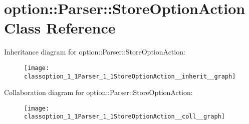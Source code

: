 \hypertarget{classoption_1_1Parser_1_1StoreOptionAction}{}\section{option\+:\+:Parser\+:\+:Store\+Option\+Action Class Reference}
\label{classoption_1_1Parser_1_1StoreOptionAction}


Inheritance diagram for option\+:\+:Parser\+:\+:Store\+Option\+Action\+:
\nopagebreak
\begin{figure}[H]
\begin{center}
\leavevmode
\texttt{[image: classoption\_1\_1Parser\_1\_1StoreOptionAction\_\_inherit\_\_graph]}
\end{center}
\end{figure}


Collaboration diagram for option\+:\+:Parser\+:\+:Store\+Option\+Action\+:
\nopagebreak
\begin{figure}[H]
\begin{center}
\leavevmode
\texttt{[image: classoption\_1\_1Parser\_1\_1StoreOptionAction\_\_coll\_\_graph]}
\end{center}
\end{figure}
